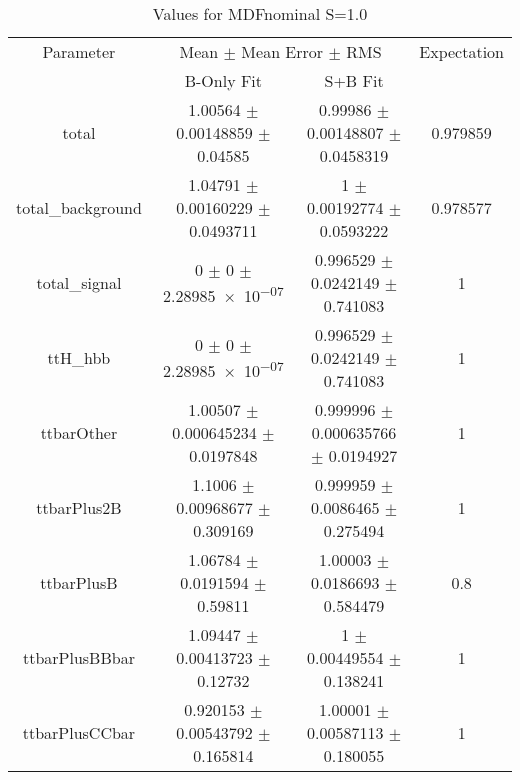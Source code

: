 \begin{table}
\centering
\caption{Values for MDFnominal S=1.0}
\begin{tabular}{cccc}
\toprule
Parameter & \multicolumn{2}{c}{Mean $\pm$ Mean Error $\pm$ RMS} & Expectation\\
 & B-Only Fit & S+B Fit & \\
\midrule
total & \num{1.00564} $\pm$ \num{0.00148859} $\pm$ \num{0.04585} & \num{0.99986} $\pm$ \num{0.00148807} $\pm$ \num{0.0458319} & \num{0.979859}\\
total\_background & \num{1.04791} $\pm$ \num{0.00160229} $\pm$ \num{0.0493711} & \num{1} $\pm$ \num{0.00192774} $\pm$ \num{0.0593222} & \num{0.978577}\\
total\_signal & \num{0} $\pm$ \num{0} $\pm$ \num{2.28985e-07} & \num{0.996529} $\pm$ \num{0.0242149} $\pm$ \num{0.741083} & \num{1}\\
ttH\_hbb & \num{0} $\pm$ \num{0} $\pm$ \num{2.28985e-07} & \num{0.996529} $\pm$ \num{0.0242149} $\pm$ \num{0.741083} & \num{1}\\
ttbarOther & \num{1.00507} $\pm$ \num{0.000645234} $\pm$ \num{0.0197848} & \num{0.999996} $\pm$ \num{0.000635766} $\pm$ \num{0.0194927} & \num{1}\\
ttbarPlus2B & \num{1.1006} $\pm$ \num{0.00968677} $\pm$ \num{0.309169} & \num{0.999959} $\pm$ \num{0.0086465} $\pm$ \num{0.275494} & \num{1}\\
ttbarPlusB & \num{1.06784} $\pm$ \num{0.0191594} $\pm$ \num{0.59811} & \num{1.00003} $\pm$ \num{0.0186693} $\pm$ \num{0.584479} & \num{0.8}\\
ttbarPlusBBbar & \num{1.09447} $\pm$ \num{0.00413723} $\pm$ \num{0.12732} & \num{1} $\pm$ \num{0.00449554} $\pm$ \num{0.138241} & \num{1}\\
ttbarPlusCCbar & \num{0.920153} $\pm$ \num{0.00543792} $\pm$ \num{0.165814} & \num{1.00001} $\pm$ \num{0.00587113} $\pm$ \num{0.180055} & \num{1}\\
\bottomrule
\end{tabular}
\end{table}